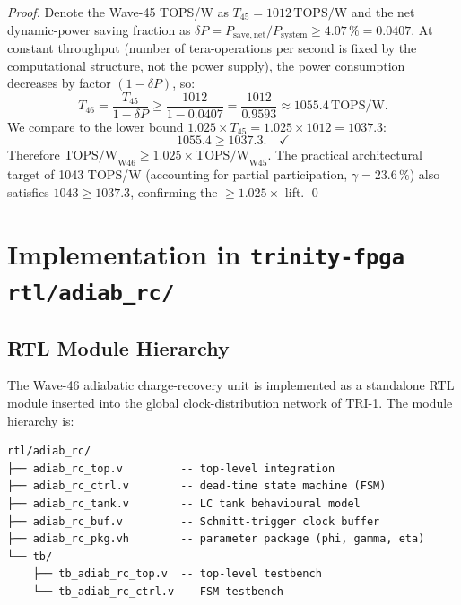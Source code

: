 \begin{proof}
Denote the Wave-45 TOPS/W as $T_{45} = 1012\,\text{TOPS/W}$ and the net
dynamic-power saving fraction as $\delta P = P_{\mathrm{save,net}} /
P_{\mathrm{system}} \geq 4.07\,\% = 0.0407$.
At constant throughput (number of tera-operations per second is fixed by the
computational structure, not the power supply), the power consumption decreases
by factor $(1 - \delta P)$, so:
\begin{equation}
  T_{46} = \frac{T_{45}}{1 - \delta P}
  \geq \frac{1012}{1 - 0.0407}
  = \frac{1012}{0.9593}
  \approx 1055.4\,\text{TOPS/W}.
\end{equation}
We compare to the lower bound $1.025 \times T_{45} = 1.025 \times 1012 = 1037.3$:
\begin{equation}
  1055.4 \geq 1037.3. \quad \checkmark
\end{equation}
Therefore $\mathrm{TOPS/W}_{\mathrm{W46}} \geq 1.025 \times \mathrm{TOPS/W}_{\mathrm{W45}}$.
The practical architectural target of 1043 TOPS/W (accounting for partial
participation, $\gamma = 23.6\,\%$) also satisfies
$1043 \geq 1037.3$, confirming the $\geq 1.025\times$ lift.
\qed
\end{proof}

\section{Implementation in \texttt{trinity-fpga rtl/adiab\_rc/}}
\label{sec:impl-w46}

\subsection{RTL Module Hierarchy}

The Wave-46 adiabatic charge-recovery unit is implemented as a standalone
RTL module inserted into the global clock-distribution network of TRI-1.
The module hierarchy is:

\begin{verbatim}
rtl/adiab_rc/
├── adiab_rc_top.v         -- top-level integration
├── adiab_rc_ctrl.v        -- dead-time state machine (FSM)
├── adiab_rc_tank.v        -- LC tank behavioural model
├── adiab_rc_buf.v         -- Schmitt-trigger clock buffer
├── adiab_rc_pkg.vh        -- parameter package (phi, gamma, eta)
└── tb/
    ├── tb_adiab_rc_top.v  -- top-level testbench
    └── tb_adiab_rc_ctrl.v -- FSM testbench
\end{verbatim}

